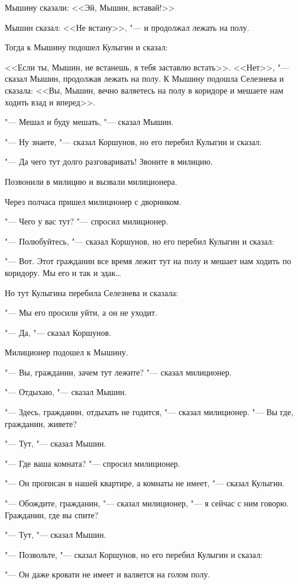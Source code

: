 Мышину сказали: <<Эй, Мышин, вставай!>>

Мышин сказал: <<Не встану>>, "--- и продолжал лежать на полу.

Тогда к Мышину подошел Кулыгин и сказал:

<<Если ты, Мышин, не встанешь, я тебя заставлю встать>>. <<Нет>>, "--- сказал Мышин, продолжая лежать на полу. К Мышину подошла Селезнева и сказала: <<Вы, Мышин, вечно валяетесь на полу в коридоре и мешаете нам ходить взад и вперед>>.

"--- Мешал и буду мешать, "--- сказал Мышин.

"--- Ну знаете, "--- сказал Коршунов, но его перебил Кулыгин и сказал:

"--- Да чего тут долго разговаривать! Звоните в милицию.

Позвонили в милицию и вызвали милиционера.

Через полчаса пришел милиционер с дворником.

"--- Чего у вас тут? "--- спросил милиционер.

"--- Полюбуйтесь, "--- сказал Коршунов, но его перебил Кулыгин и сказал:

"--- Вот. Этот гражданин все время лежит тут на полу и мешает нам ходить по коридору. Мы его и так и эдак\dots

Но тут Кулыгина перебила Селезнева и сказала:

"--- Мы его просили уйти, а он не уходит.

"--- Да, "--- сказал Коршунов.

Милиционер подошел к Мышину.

"--- Вы, гражданин, зачем тут лежите? "--- сказал милиционер.

"--- Отдыхаю, "--- сказал Мышин.

"--- Здесь, гражданин, отдыхать не годится, "--- сказал милиционер. "--- Вы где, гражданин, живете?

"--- Тут, "--- сказал Мышин.

"--- Где ваша комната? "--- спросил милиционер.

"--- Он прописан в нашей квартире, а комнаты не имеет, "--- сказал Кулыгин.

"--- Обождите, гражданин, "--- сказал милиционер, "--- я сейчас с ним говорю. Гражданин, где вы спите?

"--- Тут, "--- сказал Мышин.

"--- Позвольте, "--- сказал Коршунов, но его перебил Кулыгин и сказал:

"--- Он даже кровати не имеет и валяется на голом полу.

